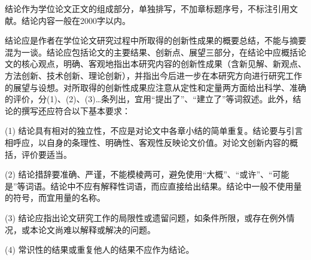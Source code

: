 \makeatletter
{}
  \pagestyle{fancy}%
  \fancyhf{}
\makeatother

\begin{conclusion}
\label{chap:conclusion}

结论作为学位论文正文的组成部分，单独排写，不加章标题序号，不标注引用文献。结论内容一般在2000字以内。

结论应是作者在学位论文研究过程中所取得的创新性成果的概要总结，不能与摘要混为一谈。结论应包括论文的主要结果、创新点、展望三部分，在结论中应概括论文的核心观点，明确、客观地指出本研究内容的创新性成果（含新见解、新观点、方法创新、技术创新、理论创新），并指出今后进一步在本研究方向进行研究工作的展望与设想。对所取得的创新性成果应注意从定性和定量两方面给出科学、准确的评价，分(1)、(2)、(3)…条列出，宜用“提出了”、“建立了”等词叙述。此外，结论的撰写还应符合以下基本要求：

(1) 结论具有相对的独立性，不应是对论文中各章小结的简单重复。结论要与引言相呼应，以自身的条理性、明确性、客观性反映论文价值。对论文创新内容的概括，评价要适当。

(2) 结论措辞要准确、严谨，不能模棱两可，避免使用“大概”、“或许”、“可能是”等词语。结论中不应有解释性词语，而应直接给出结果。结论中一般不使用量的符号，而宜用量的名称。

(3) 结论应指出论文研究工作的局限性或遗留问题，如条件所限，或存在例外情况，或本论文尚难以解释或解决的问题。

(4) 常识性的结果或重复他人的结果不应作为结论。

\end{conclusion}
